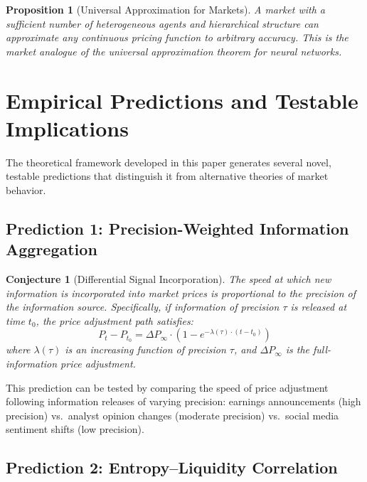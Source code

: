 \documentclass[12pt,a4paper]{article}
\newtheorem{proposition}[theorem]{Proposition}
\newtheorem{conjecture}[theorem]{Conjecture}
\theoremstyle{definition}
\begin{document}
\begin{proposition}[Universal Approximation for Markets]\label{prop:universal_approx}
A market with a sufficient number of heterogeneous agents and hierarchical structure can approximate any continuous pricing function to arbitrary accuracy. This is the market analogue of the universal approximation theorem for neural networks.
\end{proposition}



\section{Empirical Predictions and Testable Implications}\label{sec:empirical}

The theoretical framework developed in this paper generates several novel, testable predictions that distinguish it from alternative theories of market behavior.

\subsection{Prediction 1: Precision-Weighted Information Aggregation}

\begin{conjecture}[Differential Signal Incorporation]\label{conj:diff_signal}
The speed at which new information is incorporated into market prices is proportional to the precision of the information source. Specifically, if information of precision $\tau$ is released at time $t_0$, the price adjustment path satisfies:
\begin{equation}\label{eq:speed_adjustment}
    P_t - P_{t_0} = \Delta P_\infty \cdot \left(1 - e^{-\lambda(\tau) \cdot (t - t_0)}\right)
\end{equation}
where $\lambda(\tau)$ is an increasing function of precision $\tau$, and $\Delta P_\infty$ is the full-information price adjustment.
\end{conjecture}

This prediction can be tested by comparing the speed of price adjustment following information releases of varying precision: earnings announcements (high precision) vs.\ analyst opinion changes (moderate precision) vs.\ social media sentiment shifts (low precision).

\subsection{Prediction 2: Entropy--Liquidity Correlation}
\end{document}
